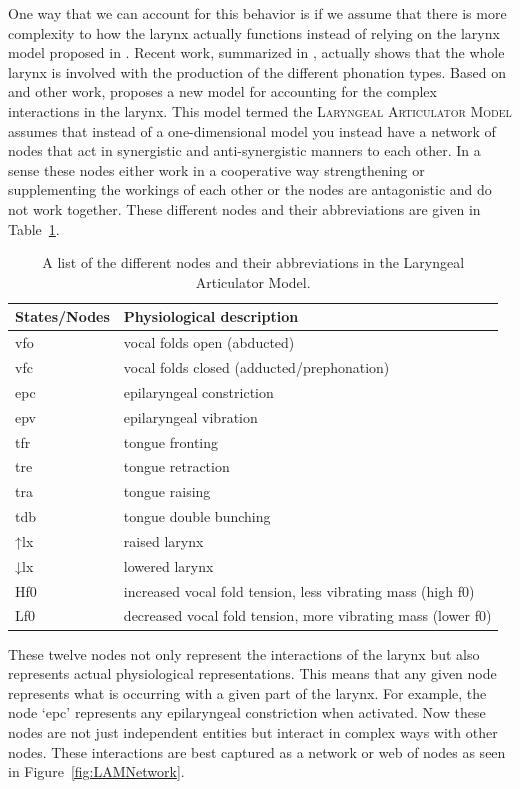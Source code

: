 \documentclass[12pt, letterpaper]{article}
\providecommand{\lsptoprule}{\midrule\toprule}
\providecommand{\lspbottomrule}{\bottomrule\midrule}
\begin{document}
One way that we can account for this behavior is if we assume that there is more complexity to how the larynx actually functions instead of relying on the larynx model proposed in \cite{ladefogedPreliminariesLinguisticPhonetics1971}. Recent work, summarized in \citet{eslingVoiceQualityLaryngeal2019}, actually shows that the whole larynx is involved with the production of the different phonation types. Based on \citet{moisikModelingBiomechanicalInfluence2014} and other work, \citet{eslingVoiceQualityLaryngeal2019} proposes a new model for accounting for the complex interactions in the larynx. This model termed the \textsc{Laryngeal Articulator Model} assumes that instead of a one-dimensional model you instead have a network of nodes that act in synergistic and anti-synergistic manners to each other. In a sense these nodes either work in a cooperative way strengthening or supplementing the workings of each other or the nodes are antagonistic and do not work together. These different nodes and their abbreviations are given in Table~\ref{tab:States}.
\begin{table}[!ht]
	\centering
	\caption{A list of the different nodes and their abbreviations in the Laryngeal Articulator Model.}
	\label{tab:States}
	 \begin{tabular}{ll}
	  \lsptoprule
	  States/Nodes	&	 Physiological description \\
	  \hline
	  	vfo   	&  vocal folds open (abducted) \\
		vfc    	&  vocal folds closed (adducted/prephonation)\\
		epc   	&  epilaryngeal constriction\\
		epv			&  epilaryngeal vibration \\
		tfr 		&  tongue fronting \\
		tre 		&  tongue retraction \\
		tra 		&  tongue raising \\
		tdb 		&	 tongue double bunching\\
		↑lx     &  raised larynx\\
		↓lx			&  lowered larynx\\
		Hf0			&  increased vocal fold tension, less vibrating mass (high f0)\\
		Lf0			&  decreased vocal fold tension, more vibrating mass (lower f0)\\
	  \lspbottomrule
	 \end{tabular}
\end{table}

These twelve nodes not only represent the interactions of the larynx but also represents actual physiological representations. This means that any given node represents what is occurring with a given part of the larynx. For example, the node `epc'  represents any epilaryngeal constriction when activated. Now these nodes are not just independent entities but interact in complex ways with other nodes. These interactions are best captured as a network or web of nodes as seen in Figure~\ref{fig:LAMNetwork}. 
\end{document}
